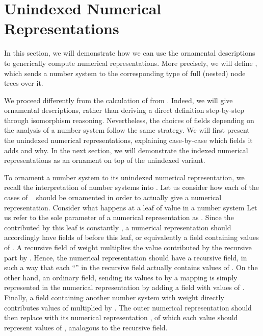 \section{Unindexed Numerical Representations}\label{sec:trieo}
In this section, we will demonstrate how we can use the ornamental descriptions to generically compute numerical representations. More precisely, we will define , which sends a number system to the corresponding type of full (nested) node trees over it.  

We proceed differently from the calculation of  from \bN{}. Indeed, we will give ornamental descriptions, rather than deriving a direct definition step-by-step through isomorphism reasoning. Nevertheless, the choices of fields depending on the analysis of a number system follow the same strategy. We will first present the unindexed numerical representations, explaining case-by-case which fields it adds and why. In the next section, we will demonstrate the indexed numerical representations as an ornament on top of the unindexed variant. %

To ornament a number system to its unindexed numerical representation, we recall the interpretation  of number systems into \bN{}. Let us consider how each of the cases of \  should be ornamented in order to actually give a numerical representation. Consider what happens at a leaf of value  in a number system
Let us refer to the sole parameter of a numerical representation as . Since the  contributed by this leaf is constantly , a numerical representation should accordingly have  fields of  before this leaf, or equivalently a field containing  values of . A recursive field of weight 
multiplies the value contributed by the recursive part by . Hence, the numerical representation should have a recursive field, in such a way that each ``'' in the recursive field actually contains  values of . On the other hand, an ordinary field, sending its values to \bN{} by a mapping 
is simply represented in the numerical representation by adding a field with  values of . Finally, a field containing another number system  with weight 
directly contributes values of  multiplied by . The outer numerical representation should then replace  with its numerical representation , of which each value should represent  values of , analogous to the recursive field.

